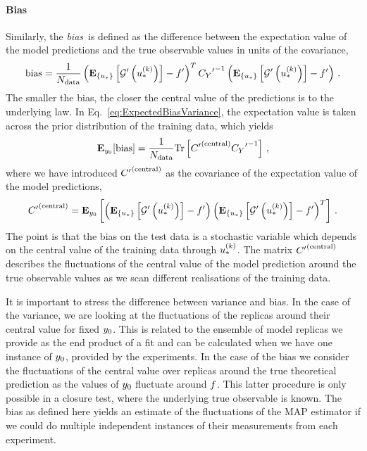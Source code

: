 \paragraph{Bias}

Similarly, the {\em bias}\ is defined as the difference between the expectation
value of the model predictions and the true observable values in units of the
covariance, \ie 
\begin{equation}
    \label{eq:BiasDef}
    {\rm bias} = \frac{1}{N_{\rm data}}
    \left( \mathbf{E}_{\{ u_* \}} \left[ {{\mathcal{G}}^{\prime}}\left(u_*^{(k)}\right) \right] - {{f}^{\prime}} \right)^T
    {{C_{Y}}^{\prime}}^{-1}
    \left( \mathbf{E}_{\{ u_* \}} \left[ {{\mathcal{G}}^{\prime}}\left(u_*^{(k)}\right) \right] - {{f}^{\prime}} \right)\, .
\end{equation}
The smaller the bias, the closer the central value of the predictions is to the
underlying law. In Eq.~\ref{eq:ExpectedBiasVariance}, the expectation value is
taken across the prior distribution of the training data, which yields
\begin{equation}
    \mathbf{E}_{y_0}[{\rm bias}] = \frac{1}{N_{\rm data}}
    {\rm Tr} \left[ {{C}^{\prime}}^{(\rm central)} {{C_{Y}}^{\prime}}^{-1} \right]\, ,
\end{equation}
where we have introduced ${{C}^{\prime}}^{(\rm central)}$ as the covariance of the expectation value
of the model predictions,
\begin{equation}
    \label{eq:CovCentDef}
    {{C}^{\prime}}^{(\rm central)} = 
    \mathbf{E}_{y_0}\left[
        \left( \mathbf{E}_{\{ u_* \}} \left[ {{\mathcal{G}}^{\prime}}\left(u_*^{(k)}\right) \right] - {{f}^{\prime}} \right)
        \left( \mathbf{E}_{\{ u_* \}} \left[ {{\mathcal{G}}^{\prime}}\left(u_*^{(k)}\right) \right] - {{f}^{\prime}} \right)^T   
    \right]\, .
\end{equation}
The point is that the bias on the test data is a stochastic variable which
depends on the central value of the training data through $u_*^{(k)}$. The
matrix ${{C}^{\prime}}^{(\rm central)}$ describes the fluctuations of the central value of the model
prediction around the true observable values as we scan different realisations
of the training data. 

It is important to stress the difference between variance and bias. In the case
of the variance, we are looking at the fluctuations of the replicas around their
central value for fixed $y_0$. This is related to the ensemble of
model replicas we provide as the end product of a fit and can be calculated when
we have one instance of $y_0$, provided by the experiments. In the
case of the bias we consider the fluctuations of the central value over replicas
around the true theoretical prediction as the values of $y_0$
fluctuate around $f$. This latter procedure is only possible in a closure
test, where the underlying true observable is known. The bias as defined here
yields an estimate of the fluctuations of the MAP estimator if we could do
multiple independent instances of their measurements from each experiment.

